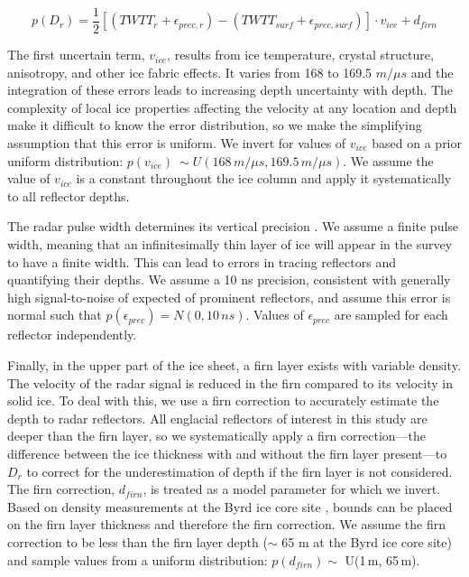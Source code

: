 \begin{equation}\label{deptheqn}
p(D_r)= \frac{1}{2}[(TWTT_r + \epsilon_{prec,r}) - (TWTT_{surf} + \epsilon_{prec,surf})] \cdot v_{ice} + d_{firn}
\end{equation}

The first uncertain term, $v_{ice}$, results from ice temperature, crystal structure, anisotropy, and other ice fabric effects. It varies from 168 to 169.5 $m/{\mu}s$ \citep{fujita2000} and the integration of these errors leads to increasing depth uncertainty with depth.  The complexity of local ice properties affecting the velocity at any location and depth make it difficult to know the error distribution, so we make the simplifying assumption that this error is uniform. We invert for values of $v_{ice}$ based on a prior uniform distribution: $p(v_{ice}) ~\sim U(168\,m/{\mu}s,169.5\,m/{\mu}s)$. We assume the value of $v_{ice}$ is a constant throughout the ice column and apply it systematically to all reflector depths.

The radar pulse width determines its vertical precision \citep{millar1982}. We assume a finite pulse width, meaning that an infinitesimally thin layer of ice will appear in the survey to have a finite width. This can lead to errors in tracing reflectors and quantifying their depths. We assume a 10 ns precision, consistent with generally high signal-to-noise of expected of prominent reflectors, and assume this error is normal such that $p(\epsilon_{prec}) = N(0,10\,ns)$. Values of $\epsilon_{prec}$ are sampled for each reflector independently.

Finally, in the upper part of the ice sheet, a firn layer exists with variable density. The velocity of the radar signal is reduced in the firn compared to its velocity in solid ice. To deal with this, we use a firn correction to accurately estimate the depth to radar reflectors. All englacial reflectors of interest in this study are deeper than the firn layer, so we systematically apply a firn correction---the difference between the ice thickness with and without the firn layer present---to $D_r$ to correct for the underestimation of depth if the firn layer is not considered. The firn correction, $d_{firn}$, is treated as a model parameter for which we invert. Based on density measurements at the Byrd ice core site \citep{gow1970}, bounds can be placed on the firn layer thickness and therefore the firn correction. We assume the firn correction to be less than the firn layer depth ($\sim$ 65 m at the Byrd ice core site) and sample values from a uniform distribution: $p(d_{firn})\sim$ U(1\,m, 65\,m). %


